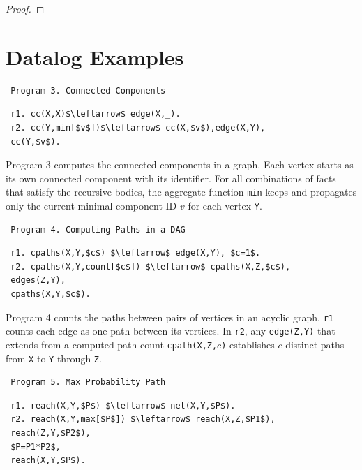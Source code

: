 \begin{appendix}
\begin{proof}
 \end{proof}
 
 
 \section{Datalog Examples}
 \label{sec:app:example}
 
 \begin{verbatim}
 Program 3. Connected Conponents
 \end{verbatim}\vspace{-0.1in}\small
 \begin{lstlisting}
 r1. cc(X,X)$\leftarrow$ edge(X,_).
 r2. cc(Y,min[$v$])$\leftarrow$ cc(X,$v$),edge(X,Y),
 cc(Y,$v$).
 \end{lstlisting}
 \normalsize
 
 Program 3 computes the connected components in a graph. Each vertex starts as its own connected component with its identifier. For all combinations of facts that satisfy the recursive bodies, the aggregate function \texttt{min} keeps and propagates only the current minimal component ID $v$ for each vertex \texttt{Y}.
 
 \begin{verbatim}
 Program 4. Computing Paths in a DAG
 \end{verbatim}\vspace{-0.1in}\small
 \begin{lstlisting}
 r1. cpaths(X,Y,$c$) $\leftarrow$ edge(X,Y), $c=1$.
 r2. cpaths(X,Y,count[$c$]) $\leftarrow$ cpaths(X,Z,$c$),
 edges(Z,Y),
 cpaths(X,Y,$c$).
 \end{lstlisting}
 \normalsize
 
 Program 4 counts the paths between pairs of vertices in an acyclic graph. \texttt{r1} counts each edge as one path between its vertices. In \texttt{r2}, any \texttt{edge(Z,Y)} that extends from a computed path count \texttt{cpath(X,Z,$c$)} establishes $c$ distinct paths from \texttt{X} to \texttt{Y} through \texttt{Z}.
 
 
 \begin{verbatim}
 Program 5. Max Probability Path
 \end{verbatim}\vspace{-0.1in}\small
 \begin{lstlisting}
 r1. reach(X,Y,$P$) $\leftarrow$ net(X,Y,$P$).
 r2. reach(X,Y,max[$P$]) $\leftarrow$ reach(X,Z,$P1$),
 reach(Z,Y,$P2$),
 $P=P1*P2$,
 reach(X,Y,$P$).
 \end{lstlisting}
 \normalsize
 

\end{appendix}
